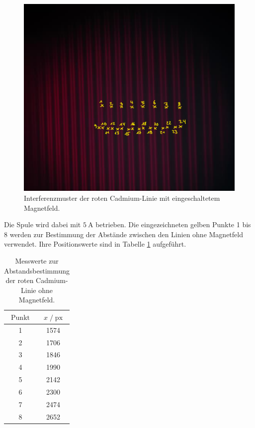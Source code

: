 \begin{figure}
    \centering
    \includegraphics[scale=0.35]{content/rot.png}
    \vspace{-10pt}
    \caption{Interferenzmuster der roten Cadmium-Linie mit eingeschaltetem Magnetfeld.}
    \label{fig:rot}
\end{figure}

Die Spule wird dabei mit $\SI{5}{\ampere}$ betrieben. Die eingezeichneten gelben Punkte 1 bis 8 werden zur Bestimmung der Abstände
zwischen den Linien ohne Magnetfeld verwendet. Ihre Positionswerte sind in Tabelle \ref{tab:mess2} aufgeführt. 

\begin{table}[H]
    \centering
    \caption{Messwerte zur Abstandsbestimmung der roten Cadmium-Linie ohne Magnetfeld.}
    \label{tab:mess2}
    \begin{tabular}{c c}
    \toprule
    $\text{Punkt}$ & $x \;/\; \text{px}$ \\
    \midrule
        1 & 1574\\
        2 & 1706\\
        3 & 1846\\
        4 & 1990\\
        5 & 2142\\
        6 & 2300\\
        7 & 2474\\
        8 & 2652\\
    \bottomrule
    \end{tabular}
\end{table}

